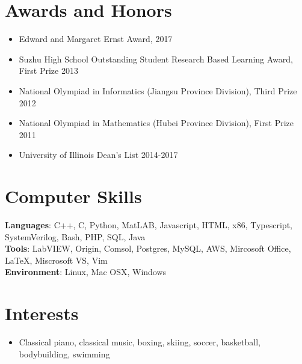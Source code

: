 \documentclass[hidelinks,letterpaper,11pt]{article} %
\newcommand{\resumeSubHeadingListStart}{\begin{itemize}[leftmargin=*]}
\newcommand{\resumeSubHeadingListEnd}{\end{itemize}}
\begin{document}
\section{Awards and Honors}
  \resumeSubHeadingListStart
    \item\small{ {Edward and Margaret Ernst Award, 2017 } \\ } \vspace{-2pt}
    \item\small{ {Suzhu High School Outstanding Student Research Based Learning Award, First Prize 2013} \\ } \vspace{-2pt}
    \item\small{ {National Olympiad in Informatics (Jiangsu Province Division), Third Prize 2012} \\ } \vspace{-2pt}
    \item\small{ {National Olympiad in Mathematics (Hubei Province Division), First Prize 2011} \\ } \vspace{-2pt}
    \item\small{ {University of Illinois Dean's List 2014-2017} \\ } \vspace{-4pt}
  \resumeSubHeadingListEnd

\section{Computer Skills}
\small{ \textbf{Languages}: C++, C, Python, MatLAB, Javascript, HTML, x86, Typescript, SystemVerilog, Bash, PHP, SQL, Java} \\
\small{ \textbf{Tools}: LabVIEW, Origin, Comsol, Postgres, MySQL, AWS, Mircosoft Office, LaTeX, Miscrosoft VS, Vim} \\
\small{ \textbf{Environment}: Linux, Mac OSX, Windows} \\

\section{Interests}
  \resumeSubHeadingListStart
      \item\small{
        {Classical piano, classical music, boxing, skiing, soccer, basketball, bodybuilding, swimming \vspace{-2pt}}
      }
  \resumeSubHeadingListEnd

%


\end{document}
